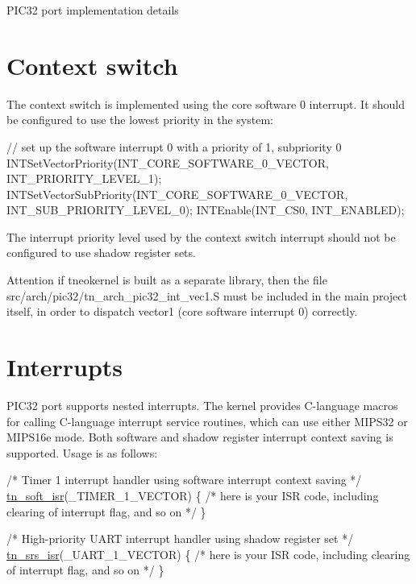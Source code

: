 P\+I\+C32 port implementation details\hypertarget{pic32_details_pic32_context_switch}{}\section{Context switch}\label{pic32_details_pic32_context_switch}
The context switch is implemented using the core software 0 interrupt. It should be configured to use the lowest priority in the system\+:


\begin{DoxyCode}
\textcolor{comment}{// set up the software interrupt 0 with a priority of 1, subpriority 0}
INTSetVectorPriority(INT\_CORE\_SOFTWARE\_0\_VECTOR, INT\_PRIORITY\_LEVEL\_1);
INTSetVectorSubPriority(INT\_CORE\_SOFTWARE\_0\_VECTOR, INT\_SUB\_PRIORITY\_LEVEL\_0);
INTEnable(INT\_CS0, INT\_ENABLED);
\end{DoxyCode}


The interrupt priority level used by the context switch interrupt should not be configured to use shadow register sets.

\begin{DoxyAttention}{Attention}
if tneokernel is built as a separate library, then the file {\ttfamily src/arch/pic32/tn\+\_\+arch\+\_\+pic32\+\_\+int\+\_\+vec1.\+S} must be included in the main project itself, in order to dispatch vector1 (core software interrupt 0) correctly.
\end{DoxyAttention}
\hypertarget{pic32_details_pic32_interrupts}{}\section{Interrupts}\label{pic32_details_pic32_interrupts}
P\+I\+C32 port supports nested interrupts. The kernel provides C-\/language macros for calling C-\/language interrupt service routines, which can use either M\+I\+P\+S32 or M\+I\+P\+S16e mode. Both software and shadow register interrupt context saving is supported. Usage is as follows\+:


\begin{DoxyCode}
\textcolor{comment}{/* Timer 1 interrupt handler using software interrupt context saving */}
\hyperlink{tn__arch__pic32_8h_a46a860d030e59e2c6aa827ca5ad36a37}{tn\_soft\_isr}(\_TIMER\_1\_VECTOR)
\{
   \textcolor{comment}{/* here is your ISR code, including clearing of interrupt flag, and so on */}
\}

\textcolor{comment}{/* High-priority UART interrupt handler using shadow register set */}
\hyperlink{tn__arch__pic32_8h_acb97f377bb993c30f6c83c582978d895}{tn\_srs\_isr}(\_UART\_1\_VECTOR)
\{
   \textcolor{comment}{/* here is your ISR code, including clearing of interrupt flag, and so on */}
\}
\end{DoxyCode}


